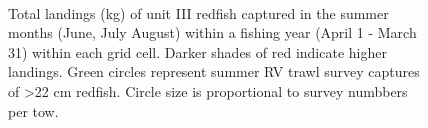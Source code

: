 \documentclass[11pt]{article}
\newcommand{\D}{.}
\newcommand{\e}{/home/ecomod_data/redfish/figures/}
\begin{document}
\begin{landscape}
\begin{figure}
\centering
{}
\\
\caption{Total landings (kg) of unit III redfish captured in the summer months (June, July August) within a fishing year (April 1 - March 31) within each grid cell. Darker shades of red indicate higher landings. Green circles represent summer RV trawl survey captures of \textgreater 22 cm redfish. Circle size is proportional to survey numbbers per tow.}
\end{figure}
\clearpage
\end{landscape}
\end{document}
